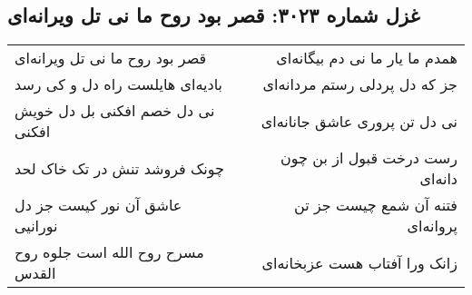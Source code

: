 \begin{center}
\section*{غزل شماره ۳۰۲۳: قصر بود روح ما نی تل ویرانه‌ای}
\label{sec:3023}
\begin{longtable}{l p{0.5cm} r}
قصر بود روح ما نی تل ویرانه‌ای
&&
همدم ما یار ما نی دم بیگانه‌ای
\\
بادیه‌ای هایلست راه دل و کی رسد
&&
جز که دل پردلی رستم مردانه‌ای
\\
نی دل خصم افکنی بل دل خویش افکنی
&&
نی دل تن پروری عاشق جانانه‌ای
\\
چونک فروشد تنش در تک خاک لحد
&&
رست درخت قبول از بن چون دانه‌ای
\\
عاشق آن نور کیست جز دل نورانیی
&&
فتنه آن شمع چیست جز تن پروانه‌ای
\\
مسرح روح الله است جلوه روح القدس
&&
زانک ورا آفتاب هست عزبخانه‌ای
\\
\end{longtable}
\end{center}

